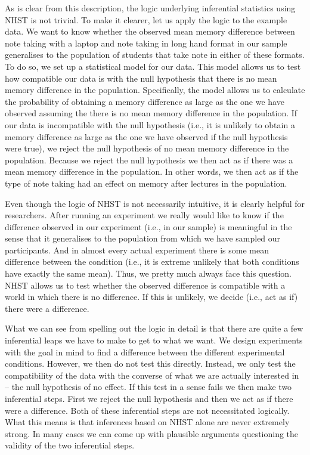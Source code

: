 \documentclass[
]{book}
\begin{document}
As is clear from this description, the logic underlying inferential statistics using NHST is not trivial. To make it clearer, let us apply the logic to the example data. We want to know whether the observed mean memory difference between note taking with a laptop and note taking in long hand format in our sample generalises to the population of students that take note in either of these formats. To do so, we set up a statistical model for our data. This model allows us to test how compatible our data is with the null hypothesis that there is no mean memory difference in the population. Specifically, the model allows us to calculate the probability of obtaining a memory difference as large as the one we have observed assuming the there is no mean memory difference in the population. If our data is incompatible with the null hypothesis (i.e., it is unlikely to obtain a memory difference as large as the one we have observed if the null hypothesis were true), we reject the null hypothesis of no mean memory difference in the population. Because we reject the null hypothesis we then act as if there was a mean memory difference in the population. In other words, we then act as if the type of note taking had an effect on memory after lectures in the population.

Even though the logic of NHST is not necessarily intuitive, it is clearly helpful for researchers. After running an experiment we really would like to know if the difference observed in our experiment (i.e., in our sample) is meaningful in the sense that it generalises to the population from which we have sampled our participants. And in almost every actual experiment there is some mean difference between the condition (i.e., it is extreme unlikely that both conditions have exactly the same mean). Thus, we pretty much always face this question. NHST allows us to test whether the observed difference is compatible with a world in which there is no difference. If this is unlikely, we decide (i.e., act as if) there were a difference.

What we can see from spelling out the logic in detail is that there are quite a few inferential leaps we have to make to get to what we want. We design experiments with the goal in mind to find a difference between the different experimental conditions. However, we then do not test this directly. Instead, we only test the compatibility of the data with the converse of what we are actually interested in -- the null hypothesis of no effect. If this test in a sense fails we then make two inferential steps. First we reject the null hypothesis and then we act as if there were a difference. Both of these inferential steps are not necessitated logically. What this means is that inferences based on NHST alone are never extremely strong. In many cases we can come up with plausible arguments questioning the validity of the two inferential steps.
\end{document}
